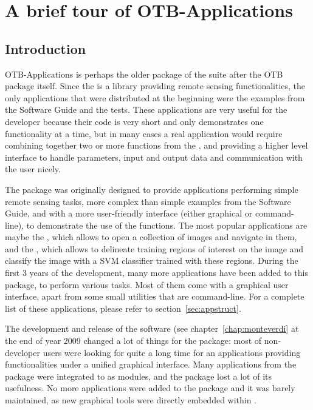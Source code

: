 \chapter{A brief tour of OTB-Applications}\label{chap:otb-applications}

\section{Introduction}\label{sec:appintro}

OTB-Applications is perhaps the older package of the \otb
suite after the OTB package itself. Since the \otb is a
library providing remote sensing functionalities, the only
applications that were distributed at the beginning were the examples
from the Software Guide and the tests. These applications are very
useful for the developer because their code is very short and only
demonstrates one functionality at a time, but in many cases a real
application would require combining together two or more functions
from the \otb, and providing a higher level interface to
handle parameters, input and output data and communication with the
user nicely.

The \app package was originally designed to provide applications
performing simple remote sensing tasks, more complex than simple
examples from the Software Guide, and with a more user-friendly
interface (either graphical or command-line), to demonstrate the use
of the \otb functions. The most popular applications are maybe the
, which allows to open a collection
of images and navigate in them, and the
, which allows to
delineate training regions of interest on the image and classify the
image with a SVM classifier trained with these regions. During the
first 3 years of the \otb development, many more applications have
been added to this package, to perform various tasks. Most of them
come with a graphical user interface, apart from some small utilities
that are command-line.  For a complete list of these applications,
please refer to section~\ref{sec:appstruct}.

The development and release of the \mont software (see
chapter~\ref{chap:monteverdi} at the end of year 2009 changed a lot of
things for the \app package: most of non-developer users were looking
for quite a long time for an applications providing \otb
functionalities under a unified graphical interface. Many applications
from the \app package were integrated to \mont as modules, and the
\app package lost a lot of its usefulness. No more applications were
added to the package and it was barely maintained, as new graphical
tools were directly embedded within \mont.

